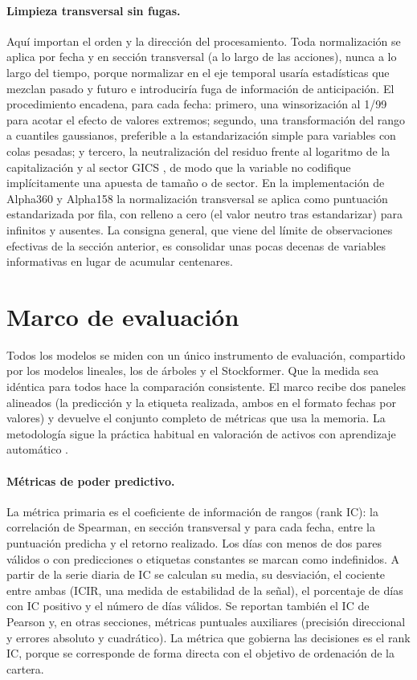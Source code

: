\paragraph{Limpieza transversal sin fugas.} Aquí importan el orden y la dirección del
procesamiento. Toda normalización se aplica por fecha y en sección transversal (a lo largo
de las acciones), nunca a lo largo del tiempo, porque normalizar en el eje temporal usaría
estadísticas que mezclan pasado y futuro e introduciría fuga de información de
anticipación. El procedimiento encadena, para cada fecha: primero, una winsorización al
1/99 para acotar el efecto de valores extremos; segundo, una transformación del rango a
cuantiles gaussianos, preferible a la estandarización simple para variables con colas
pesadas; y tercero, la neutralización del residuo frente al logaritmo de la capitalización
y al sector GICS \autocite{spdji2025methodology}, de modo que la variable no codifique
implícitamente una apuesta de tamaño o de sector. En la implementación de Alpha360 y
Alpha158 la normalización transversal se aplica como puntuación estandarizada por fila,
con relleno a cero (el valor neutro tras estandarizar) para infinitos y ausentes. La
consigna general, que viene del límite de observaciones efectivas de la sección anterior,
es consolidar unas pocas decenas de variables informativas en lugar de acumular
centenares.

\section{Marco de evaluación}\label{sec:met-harness}

Todos los modelos se miden con un único instrumento de evaluación, compartido por los modelos lineales, los de árboles y el Stockformer. Que
la medida sea idéntica para todos hace la comparación consistente. El marco recibe dos
paneles alineados (la predicción y la etiqueta realizada, ambos en el formato fechas por
valores) y devuelve el conjunto completo de métricas que usa la memoria. La metodología
sigue la práctica habitual en valoración de activos con aprendizaje automático
\autocite{gu2020empirical}.

\paragraph{Métricas de poder predictivo.} La métrica primaria es el coeficiente de
información de rangos (rank IC): la correlación de Spearman, en sección transversal y para
cada fecha, entre la puntuación predicha y el retorno realizado. Los días con menos de dos
pares válidos o con predicciones o etiquetas constantes se marcan como indefinidos. A
partir de la serie diaria de IC se calculan su media, su desviación, el cociente entre
ambas (ICIR, una medida de estabilidad de la señal), el porcentaje de días con IC positivo
y el número de días válidos. Se reportan también el IC de Pearson y, en otras secciones,
métricas puntuales auxiliares (precisión direccional y errores absoluto y cuadrático). La
métrica que gobierna las decisiones es el rank IC, porque se corresponde de forma directa
con el objetivo de ordenación de la cartera.

